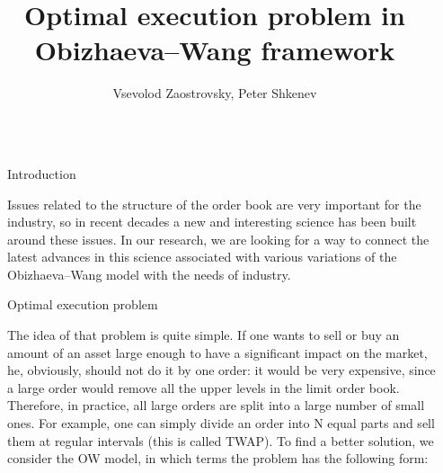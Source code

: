 \documentclass[]{beamer}
\title{Optimal execution problem in Obizhaeva--Wang framework}
\author{Vsevolod Zaostrovsky, Peter Shkenev}
\begin{document}
\nocite{*} %

\begin{frame}[t]
    \begin{columns}[t] %
     
    \begin{column}{\lrmargin}\end{column} %
    
    \begin{column}{\onecolwid} %
     
    
    \begin{block}{Introduction}
    
        Issues related to the structure of the order book are very important for the industry, 
        so in recent decades a new and interesting science has been built around these issues. In our research, we are looking for a way 
        to connect the latest advances in this science associated with various variations of the Obizhaeva--Wang model with the needs of industry.
    
    \end{block}

    \begin{block}{Optimal execution problem}
    
        The idea of that problem is quite simple. If one wants to sell or buy an amount of an asset large enough to have a significant 
        impact on the market, he, obviously, should not do it by one order: it would be very expensive, since a large order 
        would remove all the upper levels in the limit order book. Therefore, in practice, all large orders are split into a large number of small ones. 
        For example, one can simply divide an order into N equal parts and sell them at regular intervals (this is called TWAP). 
        To find a better solution, we consider the OW model, in which terms the problem has the following form: \par  




\end{block}
\end{column}
\end{columns}
\end{frame}
\end{document}
